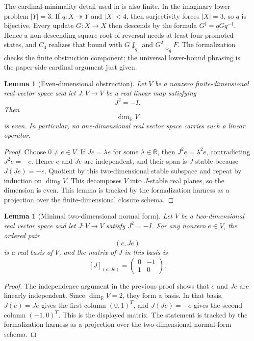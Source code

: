 \documentclass[11pt]{article}
\newtheorem{lemma}[theorem]{Lemma}
\theoremstyle{definition}
\begin{document}
The cardinal-minimality detail used in  is
also finite.  In the imaginary lower problem \(|Y|=3\).  If
\(q:X\twoheadrightarrow Y\) and \(|X|<4\), then surjectivity forces
\(|X|=3\), so \(q\) is bijective.  Every update \(G:X\to X\) then descends by
the formula \(G^\sharp=qGq^{-1}\).  Hence a non-descending square root of
reversal needs at least four promoted states, and \(C_4\) realizes that bound
with \(G\not\downarrow_q\) and \(G^2\downarrow_q F\).  The formalization checks
the finite obstruction component; the universal lower-bound phrasing is the
paper-side cardinal argument just given.

\begin{lemma}[Even-dimensional obstruction]
\label{lem:imag-even-dimensional-obstruction}
Let \(V\) be a nonzero finite-dimensional real vector space and let \(J:V\to V\) be a real linear map satisfying
\[
J^2=-I.
\]
Then
\[
\dim_{\mathbb R}V
\]
is even.  In particular, no one-dimensional real vector space carries such a linear operator.
\end{lemma}

\begin{proof}
Choose \(0\neq e\in V\).  If \(Je=\lambda e\) for some \(\lambda\in\mathbb R\),
then \(J^2e=\lambda^2e\), contradicting \(J^2e=-e\).  Hence \(e\) and \(Je\)
are independent, and their span is \(J\)-stable because \(J(Je)=-e\).  Quotient
by this two-dimensional stable subspace and repeat by induction on
\(\dim_{\mathbb R}V\).  This decomposes \(V\) into \(J\)-stable real planes, so
the dimension is even.  This lemma is tracked by the formalization harness as a
projection over the finite-dimensional closure schema.
\end{proof}

\begin{lemma}[Minimal two-dimensional normal form]
\label{lem:imag-two-dimensional-normal-form}
Let \(V\) be a two-dimensional real vector space and let \(J:V\to V\) satisfy \(J^2=-I\).  For any nonzero \(e\in V\), the ordered pair
\[
(e,Je)
\]
is a real basis of \(V\), and the matrix of \(J\) in this basis is
\[
[J]_{(e,Je)}=
\begin{pmatrix}
0&-1\\
1&0
\end{pmatrix}.
\]
\end{lemma}

\begin{proof}
The independence argument in the previous proof shows that \(e\) and \(Je\) are
linearly independent.  Since \(\dim_{\mathbb R}V=2\), they form a basis.  In
that basis, \(J(e)=Je\) gives the first column \((0,1)^T\), and
\(J(Je)=-e\) gives the second column \((-1,0)^T\).  This is the displayed
matrix.  The statement is tracked by the formalization harness as a projection
over the two-dimensional normal-form schema.
\end{proof}
\end{document}
